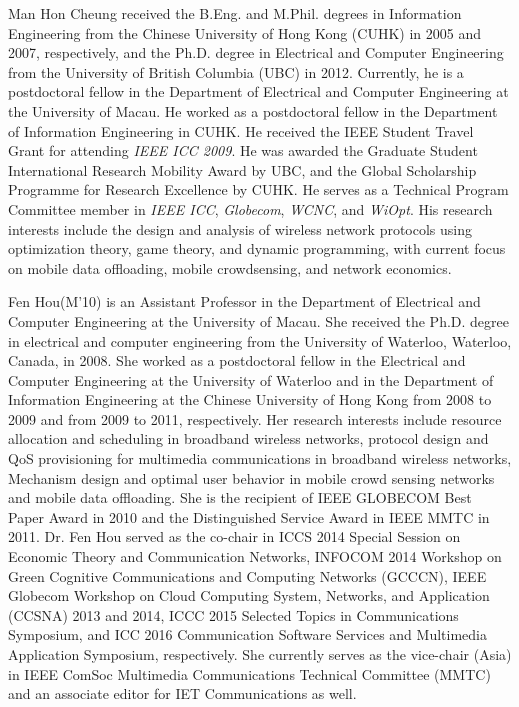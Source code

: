 \documentclass[journal]{IEEEtran}
\begin{document}
\begin{IEEEbiography}
{Man Hon Cheung} received the B.Eng. and M.Phil. degrees in Information Engineering from the Chinese University of Hong Kong (CUHK) in 2005 and 2007, respectively, and the Ph.D. degree in Electrical and Computer Engineering from the University of British Columbia (UBC) in 2012. Currently, he is a postdoctoral fellow in the Department of Electrical and Computer Engineering at the University of Macau. He worked as a postdoctoral fellow in the Department of Information Engineering in CUHK. He received the IEEE Student Travel Grant for attending {\it IEEE ICC 2009}. He was awarded the Graduate Student International Research Mobility Award by UBC, and the Global Scholarship Programme for Research Excellence by CUHK. He serves as a Technical Program Committee member in {\it IEEE ICC}, {\it Globecom}, {\it WCNC}, and {\it WiOpt}. His research interests include the design and analysis of wireless network protocols using optimization theory, game theory, and dynamic programming, with current focus on mobile data offloading, mobile crowdsensing, and network economics.
\end{IEEEbiography}


\begin{IEEEbiography}
{Fen Hou}(M'10) is an Assistant Professor in the Department of Electrical and Computer Engineering at the University of Macau. She received the Ph.D. degree in electrical and computer engineering from the University of Waterloo, Waterloo, Canada, in 2008. She worked as a postdoctoral fellow in the Electrical and Computer Engineering at the University of Waterloo and in the Department of Information Engineering at the Chinese University of Hong Kong from 2008 to 2009 and from 2009 to 2011, respectively. Her research interests include resource allocation and scheduling in broadband wireless networks, protocol design and QoS provisioning for multimedia communications in broadband wireless networks, Mechanism design and optimal user behavior in mobile crowd sensing networks and mobile data offloading. She is the recipient of IEEE GLOBECOM Best Paper Award in 2010 and the Distinguished Service Award in IEEE MMTC in 2011. Dr. Fen Hou served as the co-chair in ICCS 2014 Special Session on Economic Theory and Communication Networks, INFOCOM 2014 Workshop on Green Cognitive Communications and Computing Networks (GCCCN), IEEE Globecom Workshop on Cloud Computing System, Networks, and Application (CCSNA) 2013 and 2014, ICCC 2015 Selected Topics in Communications Symposium, and ICC 2016 Communication Software Services and Multimedia Application Symposium, respectively. She currently serves as the vice-chair (Asia) in IEEE ComSoc Multimedia Communications Technical Committee (MMTC) and an associate editor for IET Communications as well.
\end{IEEEbiography}
\end{document}
